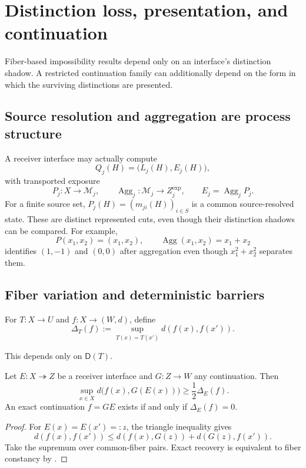 \section{Distinction loss, presentation, and continuation}\label{sec:barriers}

Fiber-based impossibility results depend only on an interface's distinction shadow. A restricted continuation family can additionally depend on the form in which the surviving distinctions are presented.

\subsection{Source resolution and aggregation are process structure}

A receiver interface may actually compute
\[
Q_j(H)=\bigl(L_j(H),E_j(H)\bigr),
\]
with transported exposure
\[
P_j:X\to\mathcal M_j,
\qquad
\operatorname{Agg}_j:\mathcal M_j\to Z_j^{\mathrm{exp}},
\qquad
E_j=\operatorname{Agg}_jP_j.
\]
For a finite source set, $P_j(H)=(m_{ji}(H))_{i\in S}$ is a common source-resolved state. These are distinct represented cuts, even though their distinction shadows can be compared. For example,
\[
P(x_1,x_2)=(x_1,x_2),
\qquad
\operatorname{Agg}(x_1,x_2)=x_1+x_2
\]
identifies $(1,-1)$ and $(0,0)$ after aggregation even though $x_1^2+x_2^2$ separates them.

\subsection{Fiber variation and deterministic barriers}

\begin{definition}\label{def:fiber-variation-v13}
For $T:X\to U$ and $f:X\to(W,d)$, define
\[
\Delta_T(f)
:=
\sup_{T(x)=T(x')}d(f(x),f(x')).
\]
\end{definition}

This depends only on $\mathsf D(T)$.

\begin{theorem}\label{thm:deterministic-barrier-v13}
Let $E:X\twoheadrightarrow Z$ be a receiver interface and $G:Z\to W$ any continuation. Then
\[
\boxed{
\sup_{x\in X}d\bigl(f(x),G(E(x))\bigr)
\ge
\frac12\Delta_E(f).
}
\]
An exact continuation $f=GE$ exists if and only if $\Delta_E(f)=0$.
\end{theorem}

\begin{proof}
For $E(x)=E(x')=:z$, the triangle inequality gives
\[
d(f(x),f(x'))
\le d(f(x),G(z))+d(G(z),f(x')).
\]
Take the supremum over common-fiber pairs. Exact recovery is equivalent to fiber constancy by .
\end{proof}

